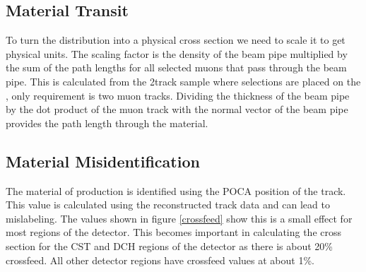 \subsection{Material Transit}
	To turn the \deltaray distribution into a physical cross section we need to scale it to get physical units. The scaling factor is the density of the beam pipe multiplied by the sum of the path lengths for all selected muons that pass through the beam pipe. This is calculated from the 2track sample where selections are placed on the \deltarays, only requirement is two muon tracks. Dividing the thickness of the beam pipe by the dot product of the muon track with the normal vector of the beam pipe provides the path length through the material.
\subsection{Material Misidentification}
	The material of \deltaray production is identified using the POCA position of the \deltaray track. This value is calculated using the reconstructed track data and can lead to mislabeling. The values shown in figure \ref{crossfeed} show this is a small effect for most regions of the detector. This becomes important in calculating the cross section for the CST and DCH regions of the detector as there is about 20\% crossfeed. All other detector regions have crossfeed values at about 1\%.
